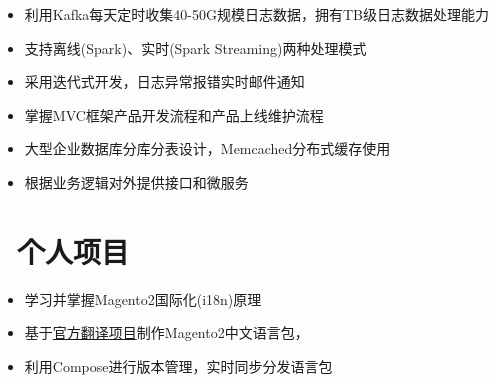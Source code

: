 \documentclass{resume}
\begin{document}
    \begin{onehalfspacing}
        \begin{itemize}
            \item 利用Kafka每天定时收集40-50G规模日志数据，拥有TB级日志数据处理能力
            \item 支持离线(Spark)、实时(Spark Streaming)两种处理模式
            \item 采用迭代式开发，日志异常报错实时邮件通知
        \end{itemize}
    \end{onehalfspacing}
    \hwj{ }

    \begin{onehalfspacing}
        \begin{itemize}
            \item 掌握MVC框架产品开发流程和产品上线维护流程
            \item 大型企业数据库分库分表设计，Memcached分布式缓存使用
            \item 根据业务逻辑对外提供接口和微服务
        \end{itemize}
    \end{onehalfspacing}
    \hwj{ }

    \section{\faBriefcase\ 个人项目}
    \begin{onehalfspacing}
        \begin{itemize}
            \item 学习并掌握Magento2国际化(i18n)原理
            \item 基于\href{https://crowdin.com/project/magento-2/zh-CN}{官方翻译项目}制作Magento2中文语言包，
            \item 利用Compose进行版本管理，实时同步分发语言包
        \end{itemize}
    \end{onehalfspacing}
    \hwj{ }
\end{document}
